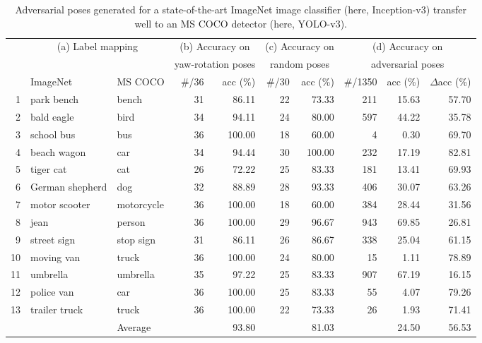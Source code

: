 \documentclass[10pt,twocolumn,letterpaper]{article}
\begin{document}
\begin{table*}
	\centering
	\begin{tabular}{rllrrrrrrr}
		\toprule
		& \multicolumn{2}{c}{(a) Label mapping} & \multicolumn{2}{c}{(b) Accuracy on} & \multicolumn{2}{c}{(c) Accuracy on} & \multicolumn{3}{c}{(d) Accuracy on} \\
		& \multicolumn{2}{c}{} & \multicolumn{2}{c}{yaw-rotation poses} & \multicolumn{2}{c}{random poses} & \multicolumn{3}{c}{adversarial poses} \\
		\cmidrule(lr){2-3}\cmidrule(lr){4-5}\cmidrule(lr){6-7}\cmidrule(lr){8-10}
		& ImageNet & MS COCO & \#/36 & acc (\%) & \#/30 & acc (\%) & \#/1350 & acc (\%) & $\Delta$acc (\%) \\
		\midrule
		1 & park bench & bench & 31 & 86.11 & 22 & 73.33 & 211 & 15.63 & 57.70 \\
		2 & bald eagle & bird & 34 & 94.11 & 24 & 80.00 & 597 & 44.22 & 35.78 \\
		3 & school bus & bus & 36 & 100.00 & 18 & 60.00 & 4 & 0.30 & 69.70 \\
		4 & beach wagon & car & 34 & 94.44 & 30 & 100.00 & 232 & 17.19 & 82.81 \\
		5 & tiger cat & cat & 26 & 72.22 & 25 & 83.33 & 181 & 13.41 & 69.93 \\
		6 & German shepherd & dog & 32 & 88.89 & 28 & 93.33 & 406 & 30.07 & 63.26 \\
		7 & motor scooter & motorcycle & 36 & 100.00 & 18 & 60.00 & 384 & 28.44 & 31.56 \\
		8 & jean & person & 36 & 100.00 & 29 & 96.67 & 943 & 69.85 & 26.81 \\
		9 & street sign & stop sign & 31 & 86.11 & 26 & 86.67 & 338 & 25.04 & 61.15 \\
		10 & moving van & truck & 36 & 100.00 & 24 & 80.00 & 15 & 1.11 & 78.89 \\
		11 & umbrella & umbrella & 35 & 97.22 & 25 & 83.33 & 907 & 67.19 & 16.15 \\
		12 & police van & car & 36 & 100.00 & 25 & 83.33 & 55 & 4.07 & 79.26 \\
		13 & trailer truck & truck & 36 & 100.00 & 22 & 73.33 & 26 & 1.93 & 71.41 \\
		\midrule
		& &Average & & 93.80 & & 81.03 & &24.50 & 56.53 \\ \bottomrule
	\end{tabular}
	\caption{
		Adversarial poses generated for a state-of-the-art ImageNet image classifier (here, Inception-v3) transfer well to an MS COCO detector (here, YOLO-v3).
}
\end{table*}
\end{document}
